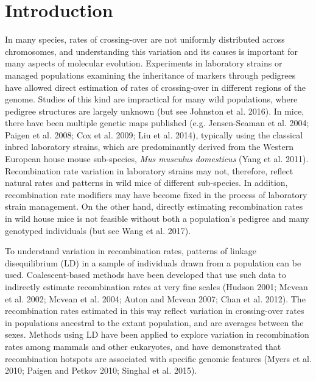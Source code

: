 \section{Introduction}
In many species, rates of crossing-over are not uniformly distributed across chromosomes, and understanding this variation and its causes is important for many aspects of molecular evolution. Experiments in laboratory strains or managed populations examining the inheritance of markers through pedigrees have allowed direct estimation of rates of crossing-over in different regions of the genome. Studies of this kind are impractical for many wild populations, where pedigree structures are largely unknown (but see Johnston et al. 2016). In mice, there have been multiple genetic maps published (e.g. Jensen-Seaman et al. 2004; Paigen et al. 2008; Cox et al. 2009; Liu et al. 2014), typically using the classical inbred laboratory strains, which are predominantly derived from the Western European house mouse sub-species, \emph{Mus musculus domesticus} (Yang et al. 2011). Recombination rate variation in laboratory strains may not, therefore, reflect natural rates and patterns in wild mice of different sub-species. In addition, recombination rate modifiers may have become fixed in the process of laboratory strain management. On the other hand, directly estimating recombination rates in wild house mice is not feasible without both a population’s pedigree and many genotyped individuals (but see Wang et al. 2017). 
 
        	To understand variation in recombination rates, patterns of linkage disequilibrium (LD) in a sample of individuals drawn from a population can be used. Coalescent-based methods have been developed that use such data to indirectly estimate recombination rates at very fine scales (Hudson 2001; Mcvean et al. 2002; Mcvean et al. 2004; Auton and Mcvean 2007; Chan et al. 2012). The recombination rates estimated in this way reflect variation in crossing-over rates in populations ancestral to the extant population, and are averages between the sexes. Methods using LD have been applied to explore variation in recombination rates among mammals and other eukaryotes, and have demonstrated that recombination hotspots are associated with specific genomic features (Myers et al. 2010; Paigen and Petkov 2010; Singhal et al. 2015).


